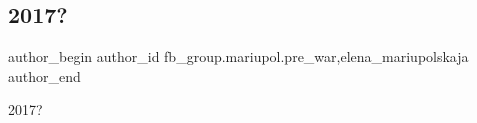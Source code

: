  
 
 
 
 

\subsection{2017?}
\label{sec:08_03_2023.fb.fb_group.mariupol.pre_war.2.2017_}
 
\ifcmt
 author_begin
   author_id fb_group.mariupol.pre_war,elena_mariupolskaja
 author_end
\fi

2017?
